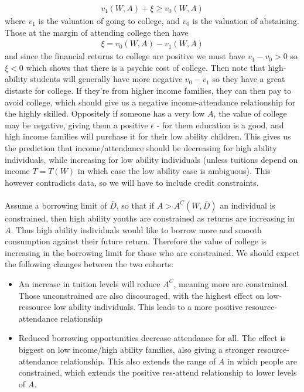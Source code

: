 \documentclass[12pt, a4paper]{article}
\begin{document}
\begin{multicols}{2}
\begin{align*}
v_1(W,A)+ \xi \geq v_0(W,A)
\end{align*}
where $v_1$ is the valuation of going to college, and $v_0$ is the valuation of abstaining. Those at the margin of attending college then have
\begin{align*}
\xi = v_0(W,A) - v_1(W,A)
\end{align*}
and since the financial returns to college are positive we must have $v_1-v_0>0$ so $\xi<0$ which shows that there is a psychic cost of college. Then note that high-ability students will generally have more negative $v_0-v_1$ so they have a great distaste for college. If they're from higher income families, they can then pay to avoid college, which should give us a negative income-attendance relationship for the highly skilled. Oppositely if someone has a very low $A$, the value of college may be negative, giving them a positive $\epsilon$ - for them education is a good, and high income families will purchase it for their low ability children. This gives us the prediction that income/attendance should be decreasing for high ability individuals, while increasing for low ability individuals (unless tuitions depend on income $T=T(W)$ in which case the low ability case is ambiguous). This however contradicts data, so we will have to include credit constraints.
\\ \\
Assume a borrowing limit of $\bar{D}$, so that if $A>A^C(W, \bar{D})$ an individual is constrained, then high ability youths are constrained as returns are increasing in $A$. Thus high ability individuals would like to borrow more and smooth consumption against their future return. Therefore the value of college is increasing in the borrowing limit for those who are constrained. We should expect the following changes between the two cohorts:
\begin{itemize}
\item[1)] An increase in tuition levels will reduce $A^C$, meaning more are constrained. Those unconstrained are also discouraged, with the highest effect on low-ressource low ability individuals. This leads to a more positive resource-attendance relationship
\item[2)] Reduced borrowing opportunities decrease attendance for all. The effect is biggest on low income/high ability families, also giving a stronger resource-attendance relationship. This also extends the range of $A$ in which people are constrained, which extends the positive res-attend relationship to lower levels of $A$.

\end{itemize}
\end{multicols}
\end{document}
